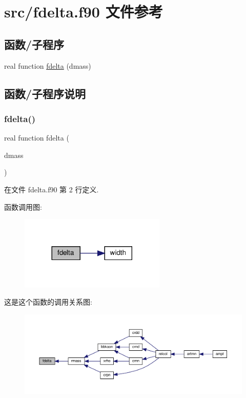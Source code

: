\hypertarget{fdelta_8f90}{}\section{src/fdelta.f90 文件参考}
\label{fdelta_8f90}
\subsection*{函数/子程序}
\begin{DoxyCompactItemize}
\item 
real function \mbox{\hyperlink{fdelta_8f90_aa2c74e74074a2f787c150a2a06eda8d6}{fdelta}} (dmass)
\end{DoxyCompactItemize}


\subsection{函数/子程序说明}
\mbox{\label{fdelta_8f90_aa2c74e74074a2f787c150a2a06eda8d6}} 
\subsubsection{\texorpdfstring{fdelta()}{fdelta()}}
{\footnotesize\ttfamily real function fdelta (\begin{DoxyParamCaption}\item[{}]{dmass }\end{DoxyParamCaption})}



在文件 fdelta.\+f90 第 2 行定义.

函数调用图\+:
\nopagebreak
\begin{figure}[H]
\begin{center}
\leavevmode
\includegraphics[width=197pt]{fdelta_8f90_aa2c74e74074a2f787c150a2a06eda8d6_cgraph}
\end{center}
\end{figure}
这是这个函数的调用关系图\+:
\nopagebreak
\begin{figure}[H]
\begin{center}
\leavevmode
\includegraphics[width=350pt]{fdelta_8f90_aa2c74e74074a2f787c150a2a06eda8d6_icgraph}
\end{center}
\end{figure}
